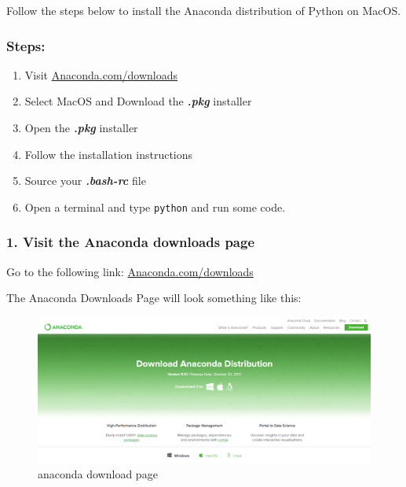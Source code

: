 \documentclass{book}
\makeatletter
\def\maxwidth{\ifdim\Gin@nat@width>\linewidth\linewidth
    \else\Gin@nat@width\fi}
\let\Oldincludegraphics\includegraphics
\renewcommand{\includegraphics}[1]{\Oldincludegraphics[width=.8\maxwidth]{#1}}
\makeatother
\begin{document}
Follow the steps below to install the Anaconda distribution of Python on
MacOS.

\subsubsection{Steps:}\label{steps}

\begin{enumerate}
\def\labelenumi{\arabic{enumi}.}
\item
  Visit
  \href{https://www.anaconda.com/download/}{Anaconda.com/downloads}
\item
  Select MacOS and Download the \textbf{\emph{.pkg}} installer
\item
  Open the \textbf{\emph{.pkg}} installer
\item
  Follow the installation instructions
\item
  Source your \textbf{\emph{.bash-rc}} file
\item
  Open a terminal and type \lstinline!python! and run some code.
\end{enumerate}
    




    
        \subsubsection{1. Visit the Anaconda downloads
page}\label{visit-the-anaconda-downloads-page}

Go to the following link:
\href{https://www.anaconda.com/download/}{Anaconda.com/downloads}

The Anaconda Downloads Page will look something like this:

\begin{figure}
\centering
\includegraphics{images/anaconda_download_page.png}
\caption{anaconda download page}
\end{figure}
    
\end{document}
